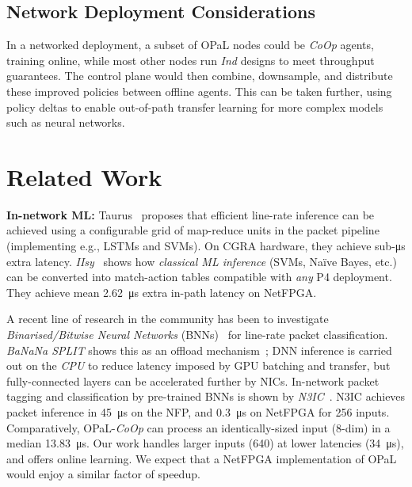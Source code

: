 \documentclass[
sigconf,natbib=false
,anonymous=true
,10pt
]{acmart}
\newcommand{\fakepara}[1]{\noindent\textbf{#1:}}
\newcommand{\approachshort}{OPaL}
\newcommand{\Coopfw}{\emph{CoOp}}
\newcommand{\coopfw}{\Coopfw}
\newcommand{\Indfw}{\emph{Ind}}
\newcommand{\indfw}{\Indfw}
\begin{document}
\subsection{Network Deployment Considerations}
In a networked deployment, a subset of \approachshort{} nodes could be \coopfw{} agents, training online, while most other nodes run \indfw{} designs to meet throughput guarantees.
The control plane would then combine, downsample, and distribute these improved policies between offline agents.
This can be taken further, using policy deltas to enable out-of-path transfer learning for more complex models such as neural networks.

\section{Related Work}
\fakepara{In-network ML}
Taurus~\parencite{DBLP:journals/corr/abs-2002-08987} proposes that efficient line-rate inference can be achieved using a configurable grid of map-reduce units in the packet pipeline (implementing e.g., LSTMs and SVMs).
On CGRA hardware, they achieve sub-\si{\micro\second} extra latency.
\emph{IIsy}~\parencite{DBLP:conf/hotnets/XiongZ19} shows how \emph{classical ML inference} (SVMs, Na\"{i}ve Bayes, etc.) can be converted into match-action tables compatible with \emph{any} P4 deployment.
They achieve mean \SI{2.62}{\micro\second} extra in-path latency on NetFPGA.

A recent line of research in the community has been to investigate \emph{Binarised/Bitwise Neural Networks} (BNNs)~\parencite{DBLP:conf/nips/HubaraCSEB16,DBLP:journals/corr/KimS16,DBLP:journals/corr/MiyashitaLM16} for line-rate packet classification.
\emph{BaNaNa SPLIT} shows this as an offload mechanism~\parencite{DBLP:conf/sigcomm/SanvitoSB18,DBLP:journals/corr/abs-1801-05731}; DNN inference is carried out on the \emph{CPU} to reduce latency imposed by GPU batching and transfer, but fully-connected layers can be accelerated further by NICs.
In-network packet tagging and classification by pre-trained BNNs is shown by \emph{N3IC}~\parencite{DBLP:journals/corr/abs-2009-02353}.
N3IC achieves packet inference in \SI{45}{\micro\second} on the NFP, and \SI{0.3}{\micro\second} on NetFPGA for \SI{256}{\bit} inputs.
Comparatively, \approachshort{}-\Coopfw{} can process an identically-sized input (8-dim) in a median \SI{13.83}{\micro\second}.
Our work handles larger inputs (\SI{640}{\bit}) at lower latencies (\SI{34}{\micro\second}), and offers online learning.
We expect that a NetFPGA implementation of \approachshort{} would enjoy a similar factor of speedup.
\end{document}
